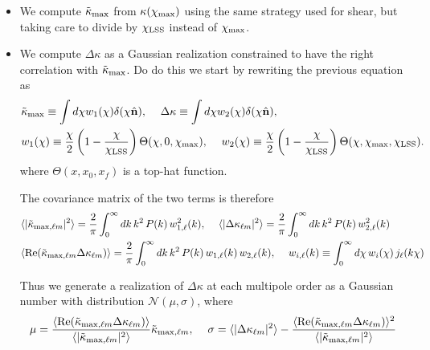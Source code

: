 \documentclass[a4paper,10pt]{article}
\begin{document}
  \begin{itemize}
    \item We compute $\tilde{\kappa}_{\rm max}$ from $\kappa(\chi_{\rm max})$ using the same
      strategy used for shear, but taking care to divide by $\chi_{\rm LSS}$ instead of $\chi_{\rm max}$.
    \item We compute $\Delta\kappa$ as a Gaussian realization constrained to have the right correlation
      with $\tilde{\kappa}_{\rm max}$. Do do this we start by rewriting the previous equation as
      \begin{align}
        &\tilde{\kappa}_{\rm max}\equiv \int d\chi w_1(\chi)\delta(\chi\hat{\bf n}),\hspace{12pt}
        \Delta \kappa           \equiv \int d\chi w_2(\chi)\delta(\chi\hat{\bf n}),\\
        &w_1(\chi)\equiv\frac{\chi}{2}\left(1-\frac{\chi}{\chi_{\rm LSS}}\right)
        \Theta(\chi,0,\chi_{\rm max}),\hspace{12pt}
        w_2(\chi)\equiv\frac{\chi}{2}\left(1-\frac{\chi}{\chi_{\rm LSS}}\right)
        \Theta(\chi,\chi_{\rm max},\chi_{\rm LSS}).
      \end{align}
      where $\Theta(x,x_0,x_f)$ is a top-hat function.

      The covariance matrix of the two terms is therefore
      \begin{align}
        &\langle|\tilde{\kappa}_{{\rm max},\ell m}|^2\rangle=\frac{2}{\pi}\int_0^\infty dk\,k^2\,P(k)\,w^2_{1,\ell}(k),\hspace{12pt}
        \langle|\Delta\kappa_{\ell m}|^2\rangle=\frac{2}{\pi}\int_0^\infty dk\,k^2\,P(k)\,w^2_{2,\ell}(k)\\
        &\langle{\rm Re}(\tilde{\kappa}_{{\rm max},\ell m}\Delta\kappa_{\ell m})\rangle=
        \frac{2}{\pi}\int_0^\infty dk\,k^2\,P(k)\,w_{1,\ell}(k)\,w_{2,\ell}(k),\hspace{12pt}
        w_{i,\ell}(k)\equiv\int_0^\infty d\chi\,w_i(\chi)\,j_\ell(k\chi)
      \end{align}

      Thus we generate a realization of $\Delta\kappa$ at each multipole order as a Gaussian number
      with distribution $\mathcal{N}(\mu,\sigma)$, where
      \begin{align}
        \mu=\frac{\langle{\rm Re}(\tilde{\kappa}_{{\rm max},\ell m}\Delta\kappa_{\ell m})\rangle}
        {\langle|\tilde{\kappa}_{{\rm max},\ell m}|^2\rangle}\tilde{\kappa}_{{\rm max},\ell m},\hspace{12pt}
        \sigma=\langle|\Delta\kappa_{\ell m}|^2\rangle-\frac{\langle{\rm Re}(\tilde{\kappa}_{{\rm max},\ell m}\Delta\kappa_{\ell m})\rangle^2}{\langle|\tilde{\kappa}_{{\rm max},\ell m}|^2\rangle}
      \end{align}
  \end{itemize}
\end{document}
